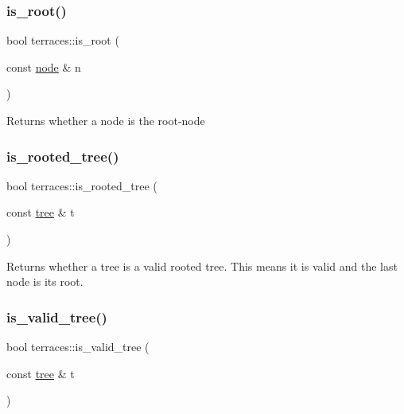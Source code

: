\mbox{\label{namespaceterraces_a501de84c86e5d84c979cf4ec3151708e}} 
\subsubsection{\texorpdfstring{is\+\_\+root()}{is\_root()}}
{\footnotesize\ttfamily bool terraces\+::is\+\_\+root (\begin{DoxyParamCaption}\item[{const \hyperlink{structterraces_1_1node}{node} \&}]{n }\end{DoxyParamCaption})\hspace{0.3cm}{\ttfamily [inline]}}

Returns whether a node is the root-\/node \mbox{\label{namespaceterraces_a4f378ba2800025b5b70a8647d70c751f}} 
\subsubsection{\texorpdfstring{is\+\_\+rooted\+\_\+tree()}{is\_rooted\_tree()}}
{\footnotesize\ttfamily bool terraces\+::is\+\_\+rooted\+\_\+tree (\begin{DoxyParamCaption}\item[{const \hyperlink{namespaceterraces_a07aaf7feec4a22c6cdefc14c5a81bdd0}{tree} \&}]{t }\end{DoxyParamCaption})}

Returns whether a tree is a valid rooted tree. This means it is valid and the last node is its root. \mbox{\label{namespaceterraces_adec8cca335bd6030520d919ee9d6aa8b}} 
\subsubsection{\texorpdfstring{is\+\_\+valid\+\_\+tree()}{is\_valid\_tree()}}
{\footnotesize\ttfamily bool terraces\+::is\+\_\+valid\+\_\+tree (\begin{DoxyParamCaption}\item[{const \hyperlink{namespaceterraces_a07aaf7feec4a22c6cdefc14c5a81bdd0}{tree} \&}]{t }\end{DoxyParamCaption})}

